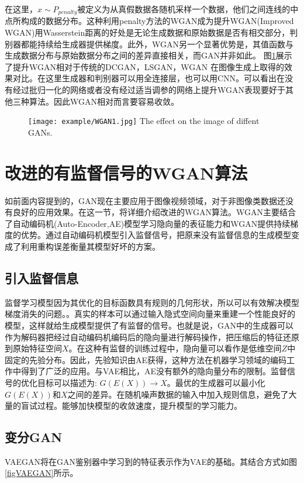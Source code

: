 在这里，$\hat{x}\sim P_{ {penalty}}$被定义为从真假数据各随机采样一个数据，他们之间连线的中点所构成的数据分布。这种利用penalty方法的WGAN成为提升WGAN(Improved WGAN)用Wasserstein距离的好处是无论生成数据和原始数据是否有相交部分，判别器都能持续给生成器提供梯度。此外，WGAN另一个显著优势是，其值函数与生成数据分布与原始数据分布之间的差异直接相关，而GAN并非如此。
图\ref{fig:GAN1}展示了提升WGAN相对于传统的DCGAN，LSGAN，WGAN 在图像生成上取得的效果对比。在这里生成器和判别器可以用全连接层，也可以用CNN。可以看出在没有经过批归一化的网络或者没有经过适当调参的网络上提升WGAN表现要好于其他三种算法。因此WGAN相对而言要容易收敛。
\begin{figure}[htbp]
	\centering
	\texttt{[image: example/WGAN1.jpg]}
	\hspace{1cm}
	{The effect on the image of diffent GANs.}
	\label{fig:GAN1}
\end{figure}

\section{改进的有监督信号的WGAN算法}
如前面内容提到的，GAN现在主要应用于图像视频领域，对于非图像类数据还没有良好的应用效果。在这一节，将详细介绍改进的WGAN算法。WGAN主要结合了自动编码机(Auto-Encoder,AE)模型学习隐向量的表征能力和WGAN提供持续梯度的优势。通过自动编码机模型引入监督信号，把原来没有监督信息的生成模型变成了利用重构误差衡量其模型好坏的方案。
\subsection{引入监督信息}
监督学习模型因为其优化的目标函数具有规则的几何形状，所以可以有效解决模型梯度消失的问题。\cite{11}。真实的样本可以通过输入隐式空间向量来重建一个性能良好的模型，这样就给生成模型提供了有监督的信号。也就是说，GAN中的生成器可以作为解码器把经过自动编码机编码后的隐向量进行解码操作，把压缩后的特征还原到原始特征空间$X$。在这种有监督的训练过程中，隐向量可以看作是低维空间$Z$中固定的先验分布。因此，先验知识由AE获得，这种方法在机器学习领域的编码工作中得到了广泛的应用。与VAE相比，AE没有额外的隐向量分布的限制。监督信号的优化目标可以描述为:  $ G(E(X))\rightarrow X $。最优的生成器可以最小化$ G(E(X))$和$X$之间的差异。在随机噪声数据的输入中加入规则信息，避免了大量的盲试过程。能够加快模型的收敛速度，提升模型的学习能力。
\subsection{变分GAN}
VAEGAN将在GAN鉴别器中学习到的特征表示作为VAE的基础。其结合方式如图\ref{figVAEGAN}所示。

